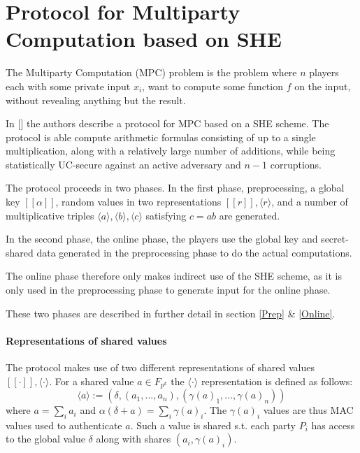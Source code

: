 \documentclass{article}
\begin{document}
\section{Protocol for Multiparty Computation based on SHE}
The Multiparty Computation (MPC) problem is the problem where $n$ players each with some private input $x_i$, want to compute some function $f$ on the input, without revealing anything but the result.

In [] the authors describe a protocol for MPC based on a SHE scheme. The protocol is able compute arithmetic formulas consisting of up to a single multiplication, along with a relatively large number of additions, while being statistically UC-secure against an active adversary and $n - 1$ corruptions.

The protocol proceeds in two phases. In the first phase, preprocessing, a global key $[\![\alpha]\!]$, random values in two representations $[\![r]\!], \langle r \rangle$, and a number of multiplicative triples $\langle a \rangle, \langle b \rangle, \langle c \rangle$ satisfying $c = ab$ are generated.

In the second phase, the online phase, the players use the global key and secret-shared data generated in the preprocessing phase to do the actual computations.

The online phase therefore only makes indirect use of the SHE scheme, as it is only used in the preprocessing phase to generate input for the online phase.

These two phases are described in further detail in section \ref{Prep} \& \ref{Online}.

\paragraph{Representations of shared values}
The protocol makes use of two different representations of shared values $[\![ \cdot ]\!], \langle \cdot \rangle$. For a shared value $a \in F_{p^k}$ the $\langle \cdot \rangle$ representation is defined as follows:
$$\langle a \rangle := (\delta, (a_1, ..., a_n), (\gamma(a)_1, ..., \gamma(a)_n))$$
where $a = \sum_i a_i$ and $\alpha (\delta + a) = \sum_i \gamma(a)_i$. The $\gamma(a)_i$ values are thus MAC values used to authenticate $a$. Such a value is shared s.t. each party $P_i$ has access to the global value $\delta$ along with shares $(a_i, \gamma(a)_i)$.
\end{document}
